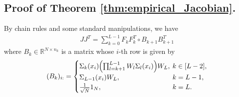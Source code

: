 \documentclass[11pt]{article}
\def\RR{\mathbb{R}}
\newenvironment{proof}{\par\noindent{\bf Proof:\ }}{\hfill$\Box$\\[2mm]}
\begin{document}
\subsection{Proof of Theorem \ref{thm:empirical_Jacobian}.}\label{subsec:proofth}
    By chain rules and some standard manipulations, we have
    \begin{align*}
	JJ^T = \sum_{k=0}^{L-1} F_{k} F_{k}^T \circ B_{k+1}B_{k+1}^T 
    \end{align*}
    where $B_k\in\RR^{N\times n_k}$ is a matrix whose $i$-th row is given by
    \begin{align*}
	(B_k)_{i:} = 
	\begin{cases}
	    \Sigma_{k}(x_i)\hspace{-.2em} \left(\prod_{l=k+1}^{L-1} W_l\Sigma_l(x_i)\right) \hspace{-.2em}W_L, &  \hspace{-.6em} k\in[L-2],\\
	    \Sigma_{L-1}(x_i)W_L, & \hspace{-.6em} k=L-1,\\
	    \frac{1}{\sqrt{N}}1_{N}, & \hspace{-.6em} k=L.
	\end{cases}
    \end{align*}
    
\end{document}

